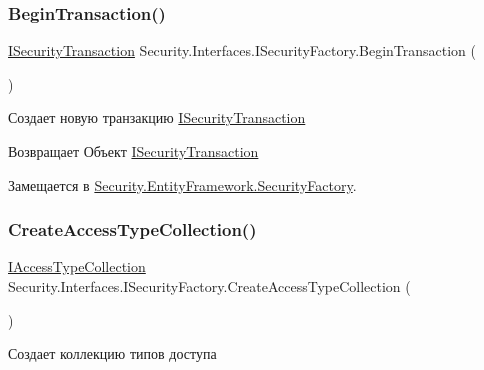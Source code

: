 \subsubsection{\texorpdfstring{Begin\+Transaction()}{BeginTransaction()}}
{\footnotesize\ttfamily \hyperlink{interface_security_1_1_interfaces_1_1_i_security_transaction}{I\+Security\+Transaction} Security.\+Interfaces.\+I\+Security\+Factory.\+Begin\+Transaction (\begin{DoxyParamCaption}{ }\end{DoxyParamCaption})}



Создает новую транзакцию \hyperlink{interface_security_1_1_interfaces_1_1_i_security_transaction}{I\+Security\+Transaction} 

\begin{DoxyReturn}{Возвращает}
Объект \hyperlink{interface_security_1_1_interfaces_1_1_i_security_transaction}{I\+Security\+Transaction}
\end{DoxyReturn}


Замещается в \hyperlink{class_security_1_1_entity_framework_1_1_security_factory_a5405f1e0c85e32a61afab9026170a114}{Security.\+Entity\+Framework.\+Security\+Factory}.

\mbox{\label{interface_security_1_1_interfaces_1_1_i_security_factory_a1b9629f58201d2335c7027f1f3653718}} 
\subsubsection{\texorpdfstring{Create\+Access\+Type\+Collection()}{CreateAccessTypeCollection()}}
{\footnotesize\ttfamily \hyperlink{interface_security_1_1_interfaces_1_1_collections_1_1_i_access_type_collection}{I\+Access\+Type\+Collection} Security.\+Interfaces.\+I\+Security\+Factory.\+Create\+Access\+Type\+Collection (\begin{DoxyParamCaption}{ }\end{DoxyParamCaption})}



Создает коллекцию типов доступа 

